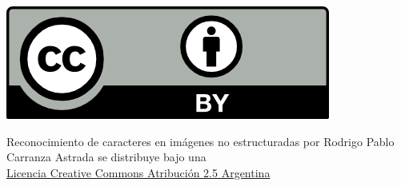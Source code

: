 \begin{titlepage}
\begin{center}
		\begin{center}
			\includegraphics[scale=0.7]{./img/license/creative_commons_license.png}
		\end{center}
			Reconocimiento de caracteres en imágenes no estructuradas por Rodrigo Pablo Carranza Astrada se distribuye bajo una \\
			\href{http://creativecommons.org/licenses/by/2.5/ar/}{Licencia Creative Commons Atribución 2.5 Argentina}
			\vfill
	\end{center}
\end{titlepage}
